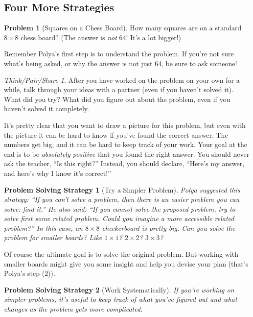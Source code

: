 \documentclass[10pt, reqno]{amsart}
\newtheorem{ps}{Problem Solving Strategy}
\theoremstyle{remark}
\newtheorem*{thinkpair*}{Think/Pair/Share}
\theoremstyle{definition}
\newtheorem{problem}{Problem}
\numberwithin{equation}{section}  %
\begin{document}
\subsection{Four More Strategies}
\begin{problem}[Squares on a Chess Board]\label{prob:chessboard}
How many squares are on a standard $8 \times 8$ chess board?  (The answer is \emph{not} 64!  It's a lot bigger!)
\end{problem}

Remember Polya's first step is to understand the problem.  If you're not sure what's being asked, or why the answer is not just 64, be sure to ask someone!


\begin{thinkpair*}
After you have worked on the problem on your own for a while, talk through your ideas with a partner (even if you haven't solved it).  What did you try?   What did you figure out about the problem, even if you haven't solved it completely.
\end{thinkpair*}


It's pretty clear that you want to draw a picture for this problem, but even with the picture it can be hard to know if you've found the correct answer.  The numbers get big, and it can be hard to keep track of your work.  Your goal at the end is to be \emph{absolutely positive} that you found the right answer.  You should never ask the teacher, ``Is this right?''  Instead, you should declare, ``Here's my answer, and here's why I know it's correct!''


\begin{ps}[Try a Simpler Problem]
 Polya suggested this strategy: ``If you can't solve a problem, then there is an easier problem you can solve: find it.''  He also said: ``If you cannot solve the proposed problem, try to solve first some related problem. Could you imagine a more accessible related problem?''  In this case, an $8 \times 8$ checkerboard is pretty big.  Can you solve the problem for smaller boards?  Like $1 \times 1$?  $2 \times 2$?  $3 \times 3$?
\end{ps}

Of course the ultimate goal is to solve the original problem.  But working with smaller boards might give you some insight and help you devise your plan (that's Polya's step (2)).


\begin{ps}[Work Systematically]
If you're working on simpler problems, it's useful to keep track of what you've figured out and what changes as the problem gets more complicated. 
\end{ps}
\end{document}
